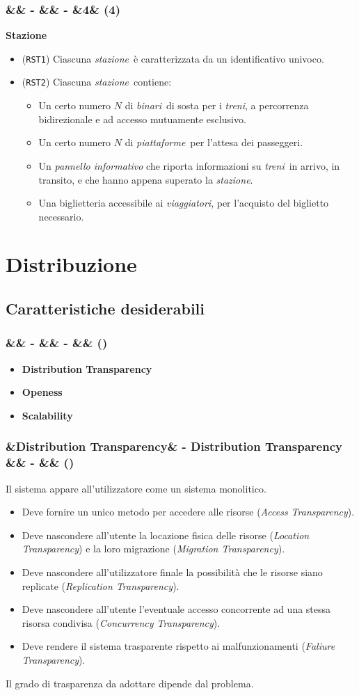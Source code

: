 \documentclass[slidestop,compress,blackandwhite]{beamer}
\newcommand{\itemB}[3]{
	\item \textbf{#1} #2 \vspace{#3}
}
\newcommand{\ttt}[1]{\texttt{#1}}
\newcommand{\ii}[1]{\textit{#1}}
\newcommand{\treni}{\ii{treni}}
\newcommand{\viaggiatori}{\ii{viaggiatori}}
\newcommand{\stazione}{\ii{stazione}}
\newcommand{\piattaforme}{\ii{piattaforme}}
\newcommand{\binari}{\ii{binari}}
\newcommand{\newtitle}[4]{
	#1 
	\ifx&#2&%
	\else
  		\large- #2
	\fi
	\ifx&#3&%
	\else
  		\normalsize- #3
	\fi
	\ifx&#4&%
	\else
  		\normalsize (#4)
	\fi
}
\newcommand{\newframe}[5]{
	\begin{frame}
		\frametitle{\newtitle{#1}{#2}{#3}{#4}}
		#5
	\end{frame}
}
\newcommand{\itemt}[1]{\item (\ttt{#1})}
\begin{document}
	\newframe{}{}{}{4}{
		\vspace{0.5cm}
		\textbf{Stazione}
		\begin{itemize}
			\itemt{RST1} Ciascuna \stazione~è caratterizzata da un identificativo univoco.
			\itemt{RST2} Ciascuna \stazione~contiene:
				\begin{itemize}
					\item Un certo numero $N$ di \binari~di sosta per i \treni, a percorrenza bidirezionale e ad accesso mutuamente esclusivo.
					\item Un certo numero $N$ di \piattaforme~per l'attesa dei passeggeri.
					\item Un \ii{pannello informativo} che riporta informazioni su \treni~in arrivo, in transito, e che hanno appena superato la \stazione.
					\item Una biglietteria accessibile ai \viaggiatori, per l'acquisto del biglietto necessario.
				\end{itemize}
		\end{itemize} 
	}


	\section{Distribuzione}
	
	\subsection{Caratteristiche desiderabili}\label{characteristics}
	\newframe{}{}{}{}{
		\begin{itemize}
			\itemB{Distribution Transparency}{}{1cm}
			\itemB{Openess}{}{1cm}
			\itemB{Scalability}{}{1cm} 
		\end{itemize}
	}
	
		
	\newframe{}{Distribution Transparency}{}{}{
		
		Il sistema appare all'utilizzatore come un sistema monolitico.
		\begin{itemize}
			\item Deve fornire un unico metodo per accedere alle risorse (\ii{Access Transparency}).
			\item Deve nascondere all'utente la locazione fisica delle risorse (\ii{Location Transparency}) e la loro migrazione (\ii{Migration Transparency}).
			\item Deve nascondere all'utilizzatore finale la possibilità che le risorse siano replicate (\ii{Replication Transparency}).
			\item Deve nascondere all'utente l'eventuale accesso concorrente ad una stessa risorsa condivisa (\ii{Concurrency Transparency}).
			\item Deve rendere il sistema trasparente rispetto ai malfunzionamenti (\ii{Faliure Transparency}).
		\end{itemize}
		
		Il grado di trasparenza da adottare dipende dal problema.
	}
	
\end{document}
